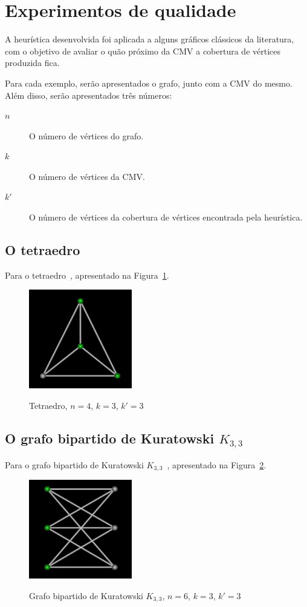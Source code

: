 \section{Experimentos de qualidade}
\label{sec:experimentos-qualidade}
A heurística desenvolvida foi aplicada a alguns gráficos clássicos da
literatura, com o objetivo de avaliar o quão próximo da CMV a
cobertura de vértices produzida fica.

Para cada exemplo, serão apresentados o grafo, junto com a
CMV do mesmo. Além disso, serão apresentados três números:
\begin{description}
    \item[$n$] O número de vértices do grafo.
    \item[$k$] O número de vértices da CMV.
    \item[$k'$] O número de vértices da cobertura de vértices
    encontrada pela heurística.
\end{description}

\subsection{O tetraedro}
Para o tetraedro~\cite{cite:example-plato},
apresentado na Figura~\ref{fig:example-tetraedro}.

\begin{figure}[htb]
\centering
\includegraphics[width=0.4\textwidth]{img/tetraedro.png}
\label{fig:example-tetraedro}
\caption{Tetraedro, $n=4$, $k=3$, $k'=3$}
\end{figure}

\subsection{O grafo bipartido de Kuratowski $K_{3,3}$}
Para o grafo bipartido de Kuratowski
$K_{3,3}$~\cite{cite:example-kuratowski},
apresentado na Figura~\ref{fig:example-kuratowski}.

\begin{figure}[htb]
\centering
\includegraphics[width=0.4\textwidth]{img/kuratowski.png}
\label{fig:example-kuratowski}
\caption{Grafo bipartido de Kuratowski $K_{3,3}$, $n=6$, $k=3$, $k'=3$}
\end{figure}


